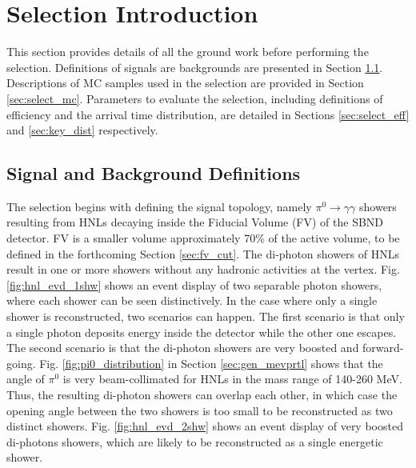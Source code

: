 
\section{Selection Introduction}
\label{sec:select_intro}

This section provides details of all the ground work before performing the selection. 
Definitions of signals are backgrounds are presented in Section \ref{sec:sig_bkg_def}.
Descriptions of MC samples used in the selection are provided in Section \ref{sec:select_mc}.
Parameters to evaluate the selection, including definitions of efficiency and the arrival time distribution, are detailed in Sections \ref{sec:select_eff} and \ref{sec:key_dist} respectively.

\subsection{Signal and Background Definitions}
\label{sec:sig_bkg_def}

The selection begins with defining the signal topology, namely $\pi^0 \rightarrow \gamma\gamma$ showers resulting from HNLs decaying inside the Fiducial Volume (FV) of the SBND detector.
FV is a smaller volume approximately 70\% of the active volume, to be defined in the forthcoming Section \ref{sec:fv_cut}.
The di-photon showers of HNLs result in one or more showers without any hadronic activities at the vertex.
Fig. \ref{fig:hnl_evd_1shw} shows an event display of two separable photon showers, where each shower can be seen distinctively.
In the case where only a single shower is reconstructed, two scenarios can happen.
The first scenario is that only a single photon deposits energy inside the detector while the other one escapes.
The second scenario is that the di-photon showers are very boosted and forward-going.
Fig. \ref{fig:pi0_distribution} in Section \ref{sec:gen_mevprtl} shows that the angle of $\pi^0$ is very beam-collimated for HNLs in the mass range of 140-260 MeV.
Thus, the resulting di-photon showers can overlap each other, in which case the opening angle between the two showers is too small to be reconstructed as two distinct showers. 
Fig. \ref{fig:hnl_evd_2shw} shows an event display of very boosted di-photons showers, which are likely to be reconstructed as a single energetic shower.

